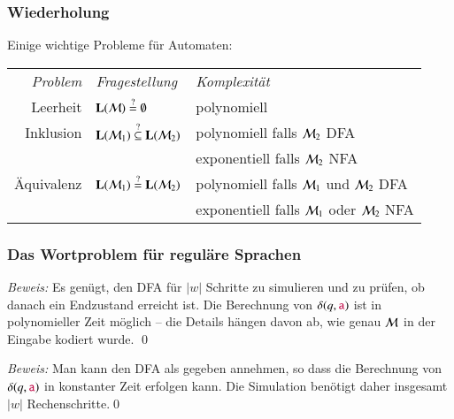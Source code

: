 \documentclass[onlymath]{beamer}
\begin{document}
\maketitle


\begin{frame}\frametitle{Wiederholung}

Einige wichtige Probleme für Automaten:\bigskip

\begin{tabular}{@{}rll@{}}
\emph{Problem} & \emph{Fragestellung} & \emph{Komplexität} \\[1ex]
Leerheit & $\textbf{\textcolor{black}{L}}(\mathcal{M})\stackrel{?}{=}\emptyset $  & polynomiell\\[1ex]
Inklusion & $\textbf{\textcolor{black}{L}}(\mathcal{M}_1)\stackrel{?}{\subseteq}\textbf{\textcolor{black}{L}}(\mathcal{M}_2)$  & polynomiell falls $\mathcal{M}_2$ DFA\\
	& & exponentiell falls $\mathcal{M}_2$ NFA\\[1ex]
Äquivalenz & $\textbf{\textcolor{black}{L}}(\mathcal{M}_1)\stackrel{?}{=}\textbf{\textcolor{black}{L}}(\mathcal{M}_2)$  & polynomiell falls $\mathcal{M}_1$ und $\mathcal{M}_2$ DFA\\
	& & exponentiell falls $\mathcal{M}_1$ oder $\mathcal{M}_2$ NFA
\end{tabular}

\end{frame}

\begin{frame}\frametitle{Das Wortproblem für reguläre Sprachen}


\pause

\emph{Beweis:} Es genügt, den DFA für $|w|$ Schritte zu simulieren und zu prüfen, ob danach ein
Endzustand erreicht ist. Die Berechnung von $\delta(q,\mathtt{\textcolor{purple}{a}})$ ist in
polynomieller Zeit möglich -- die Details hängen davon ab, wie genau $\mathcal{M}$ in der Eingabe kodiert wurde.
\qed\pause

\bigskip

\pause

\emph{Beweis:} Man kann den DFA als gegeben annehmen, so dass die Berechnung von $\delta(q,\mathtt{\textcolor{purple}{a}})$ in 
konstanter Zeit erfolgen kann. Die Simulation benötigt daher insgesamt $|w|$ Rechenschritte.\qed

\end{frame}
\end{document}
